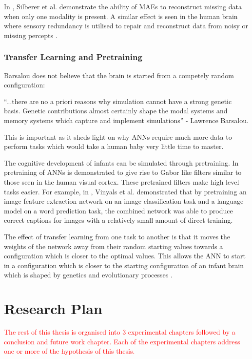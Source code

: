 In \cite{silberer2014learning}, Silberer et al. demonstrate the ability of \acp{MAE} to reconstruct missing data when only one modality is present. A similar effect is seen in the human brain where sensory redundancy is utilised to repair and reconstruct data from noisy or missing percepts \cite{samuel1997lexical}. 

\subsubsection{Transfer Learning and Pretraining}

Barsalou \cite{barsalou2008grounded} does not believe that the brain is started from a competely random configuration:
\begin{displayquote}
``...there are no a priori reasons why simulation cannot have a strong genetic basis. Genetic contributions almost certainly shape the modal systems and memory systems which capture and implement simulations'' - Lawrence Barsalou.
\end{displayquote}

This is important as it sheds light on why \acp{ANN} require much more data to perform tasks which would take a human baby very little time to master. 

The cognitive development of infants can be simulated through pretraining. In \cite{lee2008sparse} pretraining of \acp{ANN} is demonstrated to give rise to Gabor like filters similar to those seen in the human visual cortex. These pretrained filters make high level tasks easier. For example, in \cite{vinyals2015show}, Vinyals et al. demonstrated that by pretraining an image feature extraction network on an image classification task and a language model on a word prediction task, the combined network was able to produce correct captions for images with a  relatively small amount of direct training. 

The effect of transfer learning from one task to another is that it moves the weights of the network away from their random starting values towards a configuration which is closer to the optimal values. This allows the \ac{ANN} to start in a configuration which is closer to the starting configuration of an infant brain which is shaped by genetics and evolutionary processes \cite{barsalou2008grounded}.


\section{Research Plan}
\textcolor{red}{The rest of this thesis is organised into 3 experimental chapters followed by a conclusion and future work chapter.
Each of the experimental chapters address one or more of the hypothesis of this thesis.}

